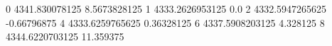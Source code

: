 0 4341.830078125 8.5673828125
1 4333.2626953125 0.0
2 4332.5947265625 -0.66796875
4 4333.6259765625 0.36328125
6 4337.5908203125 4.328125
8 4344.6220703125 11.359375

